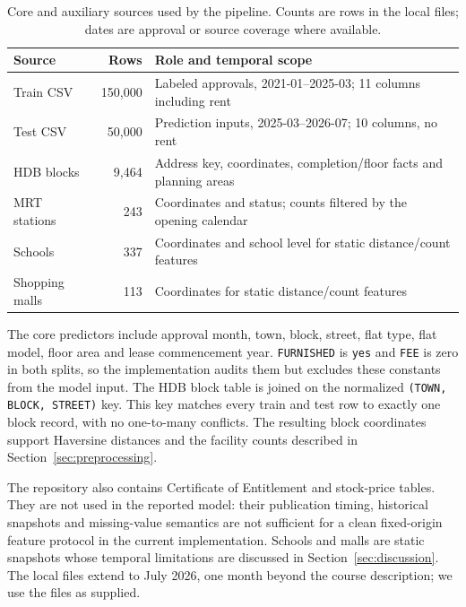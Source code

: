 \begin{table}[t]
\caption{Core and auxiliary sources used by the pipeline. Counts are rows in the local files; dates are approval or source coverage where available.}
\label{tab:data_sources}
\centering
\footnotesize
\begin{tabularx}{\columnwidth}{@{}l r X@{}}
\toprule
Source & Rows & Role and temporal scope \\
\midrule
Train CSV & 150,000 & Labeled approvals, 2021-01--2025-03; 11 columns including rent \\
Test CSV & 50,000 & Prediction inputs, 2025-03--2026-07; 10 columns, no rent \\
HDB blocks & 9,464 & Address key, coordinates, completion/floor facts and planning areas \\
MRT stations & 243 & Coordinates and status; counts filtered by the opening calendar \\
Schools & 337 & Coordinates and school level for static distance/count features \\
Shopping malls & 113 & Coordinates for static distance/count features \\
\bottomrule
\end{tabularx}
\end{table}

The core predictors include approval month, town, block, street, flat type, flat model, floor area and lease commencement year.  \texttt{FURNISHED} is \texttt{yes} and \texttt{FEE} is zero in both splits, so the implementation audits them but excludes these constants from the model input.  The HDB block table is joined on the normalized \texttt{(TOWN, BLOCK, STREET)} key.  This key matches every train and test row to exactly one block record, with no one-to-many conflicts.  The resulting block coordinates support Haversine distances and the facility counts described in Section~\ref{sec:preprocessing}.

The repository also contains Certificate of Entitlement and stock-price tables.  They are not used in the reported model: their publication timing, historical snapshots and missing-value semantics are not sufficient for a clean fixed-origin feature protocol in the current implementation.  Schools and malls are static snapshots whose temporal limitations are discussed in Section~\ref{sec:discussion}.  The local files extend to July 2026, one month beyond the course description; we use the files as supplied.
